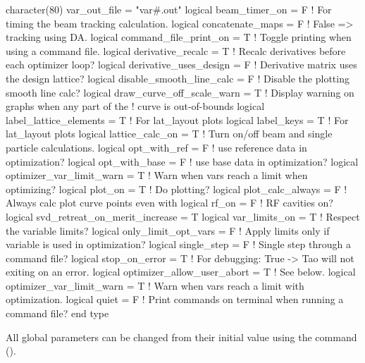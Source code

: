 {{{{{{{{\begin{example}
  character(80)  var_out_file  = "var#.out"
  logical beam_timer_on = F             ! For timing the beam tracking calculation.
  logical concatenate_maps = F          ! False => tracking using DA.
  logical command_file_print_on = T     ! Toggle printing when using a command file.
  logical derivative_recalc = T         ! Recalc derivatives before each optimizer loop?
  logical derivative_uses_design = F    ! Derivative matrix uses the design lattice?
  logical disable_smooth_line_calc = F  ! Disable the plotting smooth line calc?
  logical draw_curve_off_scale_warn = T ! Display warning on graphs when any part of the 
                                        !   curve is out-of-bounds
  logical label_lattice_elements = T    ! For lat_layout plots
  logical label_keys = T                ! For lat_layout plots
  logical lattice_calc_on = T           ! Turn on/off beam and single particle calculations.
  logical opt_with_ref = F              ! use reference data in optimization?
  logical opt_with_base = F             ! use base data in optimization?
  logical optimizer_var_limit_warn = T  ! Warn when vars reach a limit when optimizing?
  logical plot_on = T                   ! Do plotting?
  logical plot_calc_always = F          ! Always calc plot curve points even with %
  logical rf_on = F                     ! RF cavities on?
  logical svd_retreat_on_merit_increase = T    
  logical var_limits_on = T             ! Respect the variable limits?
  logical only_limit_opt_vars = F       ! Apply limits only if variable is used in optimization?
  logical single_step = F               ! Single step through a command file?
  logical stop_on_error = T             ! For debugging: True -> Tao will not exiting on an error.
  logical optimizer_allow_user_abort = T ! See below.
  logical optimizer_var_limit_warn = T   ! Warn when vars reach a limit with optimization.
  logical quiet = F                      ! Print commands on terminal when running a command file?
end type
\end{example}

All global parameters can be changed from their initial value using
the  command ().

  \begin{description}
  \item{\vn{global%
This switch controls whether printing to the terminal is suppressed when a command file is called.

}}
\end{description}}}}}}}}}
